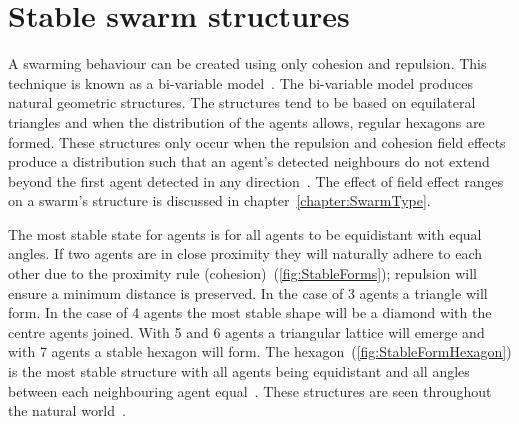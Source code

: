 
\section{Stable swarm structures}
A swarming behaviour can be created using only cohesion and repulsion. This technique is known as a bi-variable model~\cite{BAF:06,BAFVM:06}. The bi-variable model produces natural geometric structures. The structures tend to be based on equilateral triangles and when the distribution of the agents allows, regular hexagons are formed. These structures only occur when the repulsion and cohesion field effects produce a distribution such that an agent's detected neighbours do not extend beyond the first agent detected in any direction~\cite{PCL:08, PCL:08a}. The effect of field effect ranges on a swarm's structure is discussed in chapter~\ref{chapter:SwarmType}.  

The most stable state for agents is for all agents to be equidistant with equal angles. If two agents are in close proximity they will naturally adhere to each other due to the proximity rule (cohesion)~(\autoref{fig:StableForms}); repulsion will ensure a minimum distance is preserved. In the case of 3 agents a triangle will form. In the case of 4 agents the most stable shape will be a diamond with the centre agents joined. With 5 and 6 agents a triangular lattice will emerge and with 7 agents a stable hexagon will form. The hexagon~(\autoref{fig:StableFormHexagon}) is the most stable structure with all agents being equidistant and all angles between each neighbouring agent equal~\cite{BAF:06, GP:05}. These structures are seen throughout the natural world~\cite{RAZ:13}.

